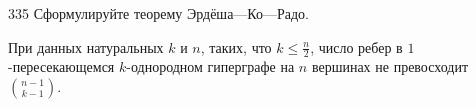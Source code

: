 \begin{task}{335}
Сформулируйте теорему Эрдёша—Ко—Радо.
\end{task}

\begin{solution}
При данных натуральных $k$ и $n$, таких, что $k\leq\frac{n}{2}$, число ребер в $1$-пересекающемся $k$-однородном гиперграфе на $n$ вершинах не превосходит $\binom{n-1}{k-1}$.
\end{solution} 